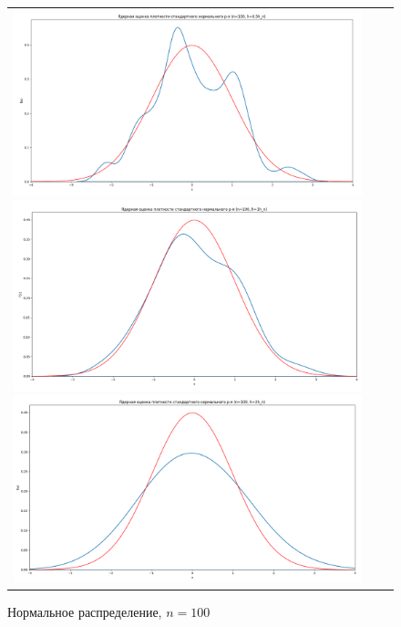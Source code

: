 \begin{figure}[H]
	\begin{tabular}{ccc}
		\includegraphics[scale=0.14]{resources/4_gauss_100_half.png}
		\includegraphics[scale=0.14]{resources/4_gauss_100_one.png}
		\includegraphics[scale=0.14]{resources/4_gauss_100_two.png}
	\end{tabular}
	\caption{Нормальное распределение, $n=100$}
\end{figure}

